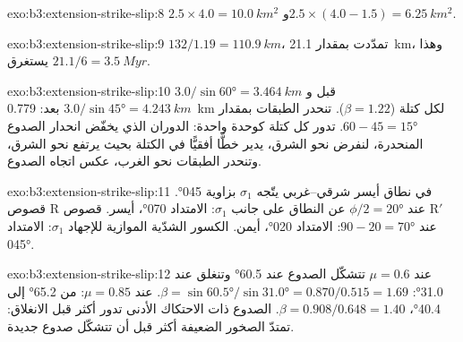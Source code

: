 \begin{solution}{exo:b3:extension-strike-slip:8}
$2.5\times4.0 = \qty{10.0}{km^2}$ و$2.5\times(4.0 - 1.5) =
\qty{6.25}{km^2}$.
\end{solution}

\begin{solution}{exo:b3:extension-strike-slip:9}
$132/1.19 = \qty{110.9}{km}$، تمدّدت بمقدار \qty{21.1}{km}، وهذا يستغرق
$21.1/6 = \qty{3.5}{Myr}$.
\end{solution}

\begin{solution}{exo:b3:extension-strike-slip:10}
$3.0/\sin\ang{60} = \qty{3.464}{km}$ قبل و$3.0/\sin\ang{45} =
\qty{4.243}{km}$ بعد: \qty{0.779}{km} لكل كتلة ($\beta = 1.22$). تنحدر الطبقات
بمقدار $60 - 45 = \ang{15}$. تدور كل كتلة كوحدة واحدة: الدوران الذي
يخفّض انحدار الصدوع المنحدرة، لنفرض نحو الشرق، يدير خطًّا أفقيًّا في
الكتلة بحيث يرتفع نحو الشرق، وتنحدر الطبقات نحو الغرب، عكس اتجاه
الصدوع.
\end{solution}

\begin{solution}{exo:b3:extension-strike-slip:11}
في نطاق أيسر شرقي--غربي يتّجه $\sigma_1$ بزاوية \ang{045}. قصوص R عند
$\phi/2 = \ang{20}$ عن النطاق على جانب $\sigma_1$: الامتداد \ang{070}،
أيسر. قصوص R$'$ عند $90 - 20 = \ang{70}$: الامتداد \ang{020}، أيمن. الكسور الشدّية
الموازية للإجهاد $\sigma_1$: الامتداد \ang{045}.
\end{solution}

\begin{solution}{exo:b3:extension-strike-slip:12}
عند $\mu = 0.6$ تتشكّل الصدوع عند \ang{60.5} وتنغلق عند \ang{31.0}: $\beta =
\sin\ang{60.5}/\sin\ang{31.0} = 0.870/0.515 = 1.69$. عند $\mu = 0.85$: من
\ang{65.2} إلى \ang{40.4}، $\beta = 0.908/0.648 = 1.40$. الصدوع ذات الاحتكاك الأدنى
تدور أكثر قبل الانغلاق: تمتدّ الصخور الضعيفة أكثر قبل أن
تتشكّل صدوع جديدة.
\end{solution}


